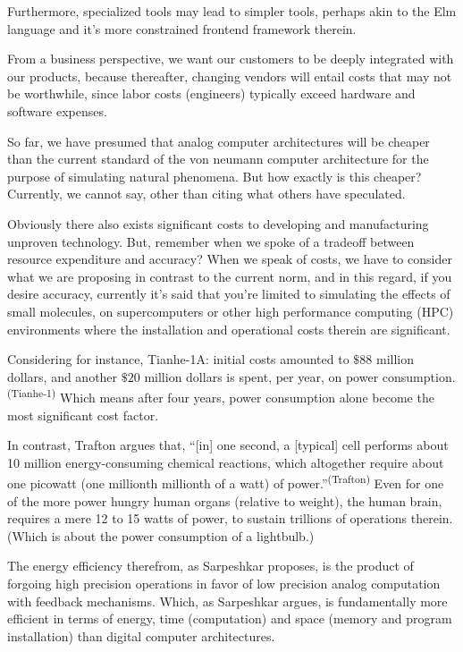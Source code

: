 Furthermore, specialized tools may lead to simpler tools, perhaps akin to the Elm language and it's more constrained frontend framework therein.


From a business perspective, we want our customers to be deeply integrated with our products, because thereafter, changing vendors will entail costs that may not be worthwhile, since labor costs (engineers) typically exceed hardware and software expenses.

So far, we have presumed that analog computer architectures will be cheaper than the current standard of the von neumann computer architecture for the purpose of simulating natural phenomena. But how exactly is this cheaper? Currently, we cannot say, other than citing what others have speculated.


Obviously there also exists significant costs to developing and manufacturing unproven technology. But, remember when we spoke of a tradeoff between resource expenditure and accuracy? When we speak of costs, we have to consider what we are proposing in contrast to the current norm, and in this regard, if you desire accuracy, currently it's said that you're limited to simulating the effects of small molecules, on supercomputers or other high performance computing (HPC) environments where the installation and operational costs therein are significant.

Considering for instance, Tianhe-1A: initial costs amounted to $\$88$ million dollars, and another $\$20$ million dollars is spent, per year, on power consumption.\textsuperscript{(Tianhe-1)} Which means after four years, power consumption alone become the most significant cost factor.

In contrast, Trafton argues that, ``[in] one second, a [typical] cell performs about 10 million energy-consuming chemical reactions, which altogether require about one picowatt (one millionth millionth of a watt) of power.''\textsuperscript{(Trafton)} Even for one of the more power hungry human organs (relative to weight), the human brain, requires a mere 12 to 15 watts of power, to sustain trillions of operations therein. (Which is about the power consumption of a lightbulb.)

The energy efficiency therefrom, as Sarpeshkar proposes, is the product of forgoing high precision operations in favor of low precision analog computation with feedback mechanisms. Which, as Sarpeshkar argues, is fundamentally more efficient in terms of energy, time (computation) and space (memory and program installation) than digital computer architectures.

